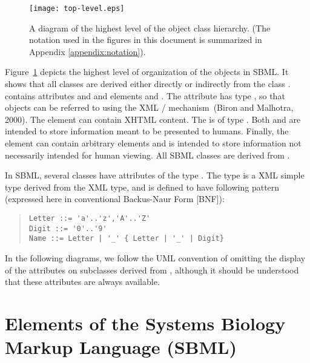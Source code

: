 \documentclass[10pt]{cek-article}
\begin{document}
\begin{figure}
  \centering
  \texttt{[image: top-level.eps]}
  \caption{A diagram of the highest level of the object class hierarchy.
    (The notation used in the figures in this document is summarized in
    Appendix \ref{appendix:notation}).}
  \label{fig:top-level}
\end{figure}

Figure~\ref{fig:top-level} depicts the highest level of organization of the
objects in SBML.  It shows that all classes are derived either directly or
indirectly from the class .   contains
attributes  and  and elements 
and .  The attribute  has type , so
that  objects can be referred to using the XML
/ mechanism~(Biron and Malhotra, 2000).  The element
 can contain XHTML content.  The  is of
type .  Both  and  are
intended to store information meant to be presented to humans.  Finally,
the element  can contain arbitrary elements and is
intended to store information not necessarily intended for human viewing.
All SBML classes are derived from .

In SBML, several classes have attributes of the type .  The
 type is a XML simple type derived from the XML 
type, and is defined to have following pattern (expressed here in
conventional Backus-Naur Form [BNF]):
\begin{quote}
\begin{verbatim}
Letter ::= 'a'..'z','A'..'Z'
Digit ::= '0'..'9'
Name ::= Letter | '_' { Letter | '_' | Digit}
\end{verbatim}
\end{quote}

In the following diagrams, we follow the UML convention of omitting the
display of the attributes on subclasses derived from ,
although it should be understood that these attributes are always
available.


\section{Elements of the Systems Biology Markup Language (SBML)}
\label{sec:elements}
\end{document}
